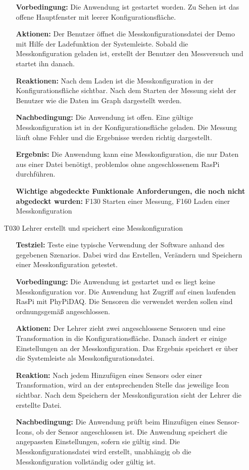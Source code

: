 \documentclass[parskip=full]{scrartcl}
\begin{document}
\begin{itemize}
\begin{itemize}
\item []\textbf{Vorbedingung:} Die Anwendung ist gestartet worden. Zu Sehen ist das offene Hauptfenster mit leerer Konfigurationsfläche.
\item []\textbf{Aktionen:} Der Benutzer öffnet die Messkonfigurationsdatei der Demo mit Hilfe der Ladefunktion der Systemleiste. Sobald die Messkonfiguration geladen ist, erstellt der Benutzer den Messversuch und startet ihn danach.
\item []\textbf{Reaktionen:} Nach dem Laden ist die Messkonfiguration in der Konfigurationsfläche sichtbar. Nach dem Starten der Messung sieht der Benutzer wie die Daten im Graph dargestellt werden.
\item []\textbf{Nachbedingung:} Die Anwendung ist offen. Eine gültige Messkonfiguration ist in der Konfigurationsfläche geladen. Die Messung läuft ohne Fehler und die Ergebnisse werden richtig dargestellt.

\item []\textbf{Ergebnis:} Die Anwendung kann eine Messkonfiguration, die nur Daten aus einer Datei benötigt, problemlos ohne angeschlossenem \gls{RasPi} durchführen. 
\item []\textbf{Wichtige abgedeckte Funktionale Anforderungen, die noch nicht abgedeckt wurden:} F130 Starten einer Messung, F160 Laden einer Messkonfiguration

\end{itemize}



\item[T030] Lehrer erstellt und speichert eine Messkonfiguration
\begin{itemize}

\item []\textbf{Testziel:} Teste eine typische Verwendung der Software anhand des gegebenen Szenarios. Dabei wird das Erstellen, Verändern und Speichern einer Messkonfiguration getestet.

\item []\textbf{Vorbedingung:} Die Anwendung ist gestartet und es liegt keine Messkonfiguration vor. Die Anwendung hat Zugriff auf einen laufenden \gls{RasPi} mit \gls{PhyPiDAQ}. Die Sensoren die verwendet werden sollen sind ordnungsgemäß angeschlossen.
\item []\textbf{Aktionen:} Der Lehrer zieht zwei angeschlossene Sensoren und eine Transformation in die Konfigurationsfläche. Danach ändert er einige Einstellungen an der Messkonfiguration. Das Ergebnis speichert er über die Systemleiste als Messkonfigurationsdatei.
\item []\textbf{Reaktion:} Nach jedem Hinzufügen eines Sensors oder einer Transformation, wird an der entsprechenden Stelle das jeweilige Icon sichtbar. Nach dem Speichern der Messkonfiguration sieht der Lehrer die erstellte Datei.
\item []\textbf{Nachbedingung:} Die Anwendung prüft beim Hinzufügen eines Sensor-Icons, ob der Sensor angeschlossen ist. Die Anwendung speichert die angepassten Einstellungen, sofern sie gültig sind. Die Messkonfigurationsdatei wird erstellt, unabhängig ob die Messkonfiguration vollständig oder gültig ist.


\end{itemize}
\end{itemize}
\end{document}
